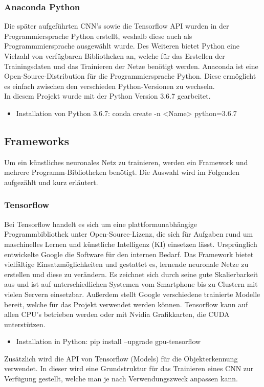 \documentclass[a4paper,12pt,oneside]{article}
\begin{document}
\subsubsection{Anaconda Python}
Die später aufgeführten CNN's sowie die Tensorflow API wurden in der Programmiersprache Python erstellt, weshalb diese auch als Programmmiersprache ausgewählt wurde. Des Weiteren bietet Python eine Vielzahl von verfügbaren Bibliotheken an, welche für das Erstellen der Trainingsdaten und das Trainieren der Netze benötigt werden. Anaconda \cite{conda2018} ist eine \glqq Open-Source-Distribution\grqq{} für die Programmiersprache Python. Diese ermöglicht es einfach zwischen den verschieden Python-Versionen zu wechseln. \\
In diesem Projekt wurde mit der Python Version 3.6.7 gearbeitet.

  \begin{itemize}
	\item Installation von Python 3.6.7: conda create -n <Name> python=3.6.7
  \end{itemize}
  
\subsection{Frameworks}
Um ein künstliches neuronales Netz zu trainieren, werden ein Framework und mehrere Programm-Bibliotheken benötigt. Die Auswahl wird im Folgenden aufgezählt und kurz erläutert.
 
\subsubsection{Tensorflow}
Bei Tensorflow \cite{google2018tens} handelt es sich um eine plattformunabhängige Programmbibliothek unter Open-Source-Lizenz, die sich für Aufgaben rund um maschinelles Lernen und künstliche Intelligenz (KI) einsetzen lässt. Ursprünglich entwickelte Google die Software für den internen Bedarf. Das Framework bietet vielfältige Einsatzmöglichkeiten und gestattet es, lernende neuronale Netze zu erstellen und diese zu verändern. Es zeichnet sich durch seine gute Skalierbarkeit aus und ist auf unterschiedlichen Systemen vom Smartphone bis zu Clustern mit vielen Servern einsetzbar. Außerdem stellt Google verschiedene trainierte Modelle bereit, welche für das Projekt verwendet werden können. Tensorflow kann auf allen CPU's betrieben werden oder mit Nvidia Grafikkarten, die CUDA unterstützen.
  \begin{itemize}
\item Installation in Python: pip install --upgrade gpu-tensorflow
  \end{itemize}
Zusätzlich wird die API von Tensorflow (Models) für die Objekterkennung verwendet. In dieser wird eine Grundstruktur für das Trainieren eines CNN zur Verfügung gestellt, welche man je nach Verwendungszweck anpassen kann.
  
\end{document}
